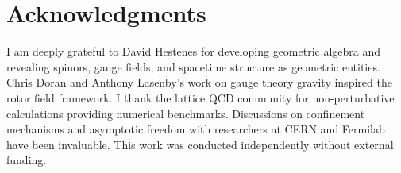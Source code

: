 \documentclass[11pt,a4paper]{article}
\theoremstyle{definition}
\theoremstyle{plain}
\theoremstyle{remark}
\begin{document}
\vspace{1em}

\section*{Acknowledgments}

I am deeply grateful to David Hestenes for developing geometric algebra and revealing spinors, gauge fields, and spacetime structure as geometric entities. Chris Doran and Anthony Lasenby's work on gauge theory gravity inspired the rotor field framework. I thank the lattice QCD community for non-perturbative calculations providing numerical benchmarks. Discussions on confinement mechanisms and asymptotic freedom with researchers at CERN and Fermilab have been invaluable. This work was conducted independently without external funding.

\vspace{1em}
\end{document}
